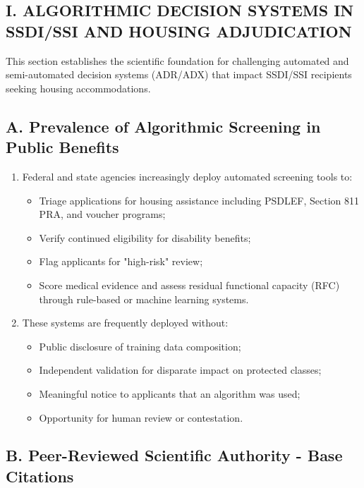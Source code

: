 \documentclass[12pt,letterpaper]{article}
\begin{document}
\begin{singlespacing}
\newpage
\section*{I. ALGORITHMIC DECISION SYSTEMS IN SSDI/SSI AND HOUSING ADJUDICATION}

This section establishes the scientific foundation for challenging automated and semi-automated decision systems (ADR/ADX) that impact SSDI/SSI recipients seeking housing accommodations.

\subsection*{A. Prevalence of Algorithmic Screening in Public Benefits}

\begin{enumerate}
    \item Federal and state agencies increasingly deploy automated screening tools to:
    \begin{itemize}
        \item Triage applications for housing assistance including PSDLEF, Section 811 PRA, and voucher programs;
        \item Verify continued eligibility for disability benefits;
        \item Flag applicants for "high-risk" review;
        \item Score medical evidence and assess residual functional capacity (RFC) through rule-based or machine learning systems.
    \end{itemize}

    \item These systems are frequently deployed without:
    \begin{itemize}
        \item Public disclosure of training data composition;
        \item Independent validation for disparate impact on protected classes;
        \item Meaningful notice to applicants that an algorithm was used;
        \item Opportunity for human review or contestation.
    \end{itemize}
\end{enumerate}

\subsection*{B. Peer-Reviewed Scientific Authority - Base Citations}


\end{singlespacing}
\end{document}
